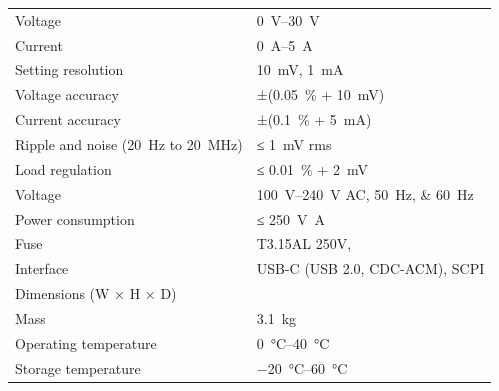 \documentclass[type=manual, lang=en-GB, otherlangs={zh-HK}]{plaindoc}
\begin{document}
\begin{xltabular}{\linewidth}{@{}LP{58mm}@{}}
\toprule
{} &  \\
\midrule
\endhead
{}
Voltage                      & \qtyrange{0}{30}{\volt} \\
Current                      & \qtyrange{0}{5}{\ampere} \\
Setting resolution           & \qty{10}{\mV}, \qty{1}{\mA} \\
Voltage accuracy             & ±(\qty{0.05}{\percent} + \qty{10}{\mV}) \\
Current accuracy             & ±(\qty{0.1}{\percent} + \qty{5}{\mA}) \\
Ripple and noise (\qty{20}{\Hz} to \qty{20}{\MHz}) & ≤ \qty{1}{\mV} rms \\
Load regulation              & ≤ \qty{0.01}{\percent} + \qty{2}{\mV} \\
\addlinespace
{}
Voltage                      & \qtyrange{100}{240}{\volt} AC, \qtylist{50;60}{\Hz} \\
Power consumption            & ≤ \qty{250}{\volt\ampere} \\
Fuse                         & T3.15AL 250V,  \\
\addlinespace
{}
Interface                    & USB-C (USB 2.0, CDC-ACM), SCPI \\
Dimensions (W × H × D)       &  \\
Mass                         & \qty{3.1}{\kg} \\
Operating temperature        & \qtyrange{0}{40}{\degreeCelsius} \\
Storage temperature          & \qtyrange{-20}{60}{\degreeCelsius} \\
\bottomrule
\end{xltabular}
\end{document}
